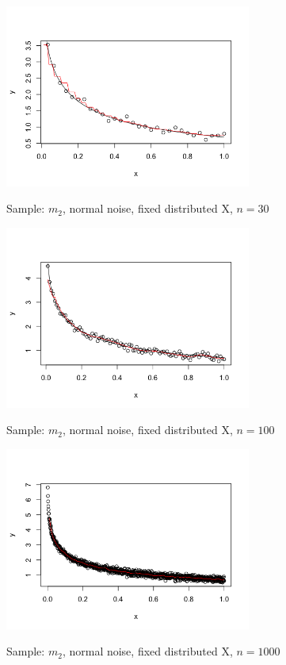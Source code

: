 \documentclass[twoside]{article}
\begin{document}
\begin{center}
\makeatletter
\def\@captype{figure}
\makeatother
\includegraphics [height=6cm]{code/m2_normal_30_fixed.png}
\caption{Sample: $m_2$, normal noise, fixed distributed X, $n=30$}
\label{m2_normal_30_fixed}
\end{center}

\begin{center}
\makeatletter
\def\@captype{figure}
\makeatother
\includegraphics [height=6cm]{code/m2_normal_100_fixed.png}
\caption{Sample: $m_2$, normal noise, fixed distributed X, $n=100$}
\label{m2_normal_100_fixed}
\end{center}

\begin{center}
\makeatletter
\def\@captype{figure}
\makeatother
\includegraphics [height=6cm]{code/m2_normal_1000_fixed.png}
\caption{Sample: $m_2$, normal noise, fixed distributed X, $n=1000$}
\label{m2_normal_1000_fixed}
\end{center}
\end{document}
